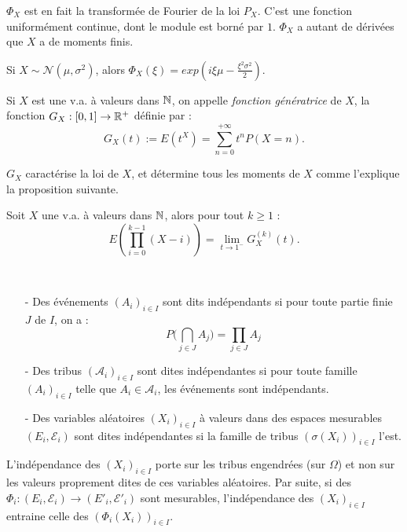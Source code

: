 \documentclass[11pt,a4paper]{article}
\begin{document}
\begin{rmq}
$\Phi_X$ est en fait la transformée de Fourier de la loi $P_X$. C'est une fonction uniformément continue, dont le module est borné par $1$. $\Phi_X$ a autant de dérivées que $X$ a de moments finis.
\end{rmq}

\begin{rmq}
Si $X\sim \mathcal{N}(\mu,\sigma^2)$, alors $\Phi_X(\xi)=exp(i\xi\mu - \frac{\xi^2\sigma^2}{2})$.
\end{rmq}

\begin{definstar}
Si $X$ est une v.a. à valeurs dans $\mathbb N$, on appelle \textit{fonction génératrice} de $X$, la fonction $G_X : [0,1] \to \mathbb R^+$ définie par : \[G_X(t) := E(t^X) = \sum_{n=0}^{+\infty} t^nP(X=n).\]
\end{definstar}

\begin{rmq}
$G_X$ caractérise la loi de $X$, et détermine tous les moments de $X$ comme l'explique la proposition suivante.
\end{rmq}

\begin{propstar}
Soit $X$ une v.a. à valeurs dans $\mathbb N$, alors pour tout $k\geq 1$ :\[E\left(\prod_{i=0}^{k-1}(X-i)\right) = \lim_{t\to 1^-}G_X^{(k)}(t).\]
\end{propstar}

\begin{definstar}[Indépendance]~
\begin{itemize}
\item[-] Des événements $(A_i)_{i\in I}$  sont dits indépendants si pour toute partie finie $J$ de $I$, on a : \[P\Big(\bigcap_{j\in J}A_j\Big)=\prod_{j\in J}A_j\]
\item[-] Des tribus  $(\mathcal{A}_i)_{i\in I}$  sont dites indépendantes si pour toute famille $(A_i)_{i\in I}$ telle que $A_i\in \mathcal{A}_i$, les événements sont indépendants.
\item[-] Des variables aléatoires $(X_i)_{i\in I}$  à valeurs dans des espaces mesurables $(E_i,\mathcal{E}_i)$ sont dites indépendantes si la famille de tribus $(\sigma(X_i))_{i\in I}$ l'est.
\end{itemize}
\end{definstar}

\begin{rmq}
L'indépendance des $(X_i)_{i\in I}$ porte sur les tribus engendrées (sur $\Omega$) et non sur les
valeurs proprement dites de ces variables aléatoires. Par suite, si des $\Phi_i : (E_i,\mathcal{E}_i) \to (E'_i,\mathcal{E}'_i)$ sont mesurables, l'indépendance des $(X_i)_{i\in I}$ entraine celle des $(\Phi_i(X_i))_{i\in I}$.
\end{rmq}
\end{document}
